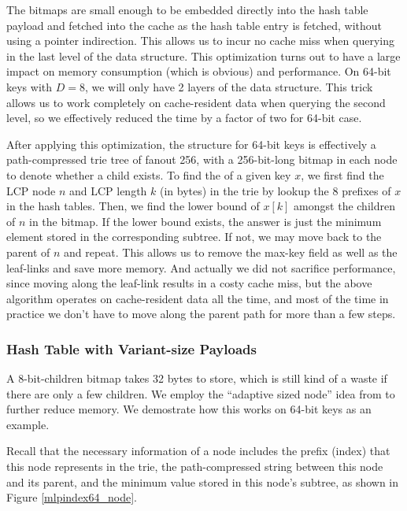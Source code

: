 \documentclass[11pt, usletter]{article}
\begin{document}
The bitmaps are small enough to be embedded directly into the hash table payload 
and fetched into the cache as the hash table entry is fetched, without using a pointer indirection. 
This allows us to incur no cache miss when querying in the last level of the data structure. 
This optimization turns out to have a large impact on memory consumption (which is obvious) and performance. 
On 64-bit keys with $D=8$, we will only have 2 layers of the data structure. 
This trick allows us to work completely on cache-resident data when querying the second level, 
so we effectively reduced the time by a factor of two for 64-bit case.

After applying this optimization, the \MlpIndex structure for 64-bit keys is effectively 
a path-compressed trie tree of fanout 256, with a 256-bit-long bitmap in each node to denote whether a child exists. 
To find the \lowerbound of a given key $x$, we first find the LCP node $n$ and LCP length $k$ (in bytes) in the trie 
by lookup the 8 prefixes of $x$ in the hash tables. 
Then, we find the lower bound of $x[k]$ amongst the children of $n$ in the bitmap. 
If the lower bound exists, the answer is just the minimum element stored in the corresponding subtree.
If not, we may move back to the parent of $n$ and repeat. 
This allows us to remove the max-key field as well as the leaf-links and save more memory. 
And actually we did not sacrifice performance, since moving along the leaf-link results in a costy cache miss, 
but the above algorithm operates on cache-resident data all the time, and most of the time in practice 
we don't have to move along the parent path for more than a few steps.

\subsubsection*{Hash Table with Variant-size Payloads}

A 8-bit-children bitmap takes 32 bytes to store, which is still kind of a waste if there are only a few children. 
We employ the ``adaptive sized node'' idea from \cite{arttrie_icde13} to further reduce memory. 
We demostrate how this works on 64-bit keys as an example. 

Recall that the necessary information of a node includes the prefix (index) that this node represents in the trie, 
the path-compressed string between this node and its parent, and the minimum value stored in this node's subtree, 
as shown in Figure \ref{mlpindex64_node}.
\end{document}
